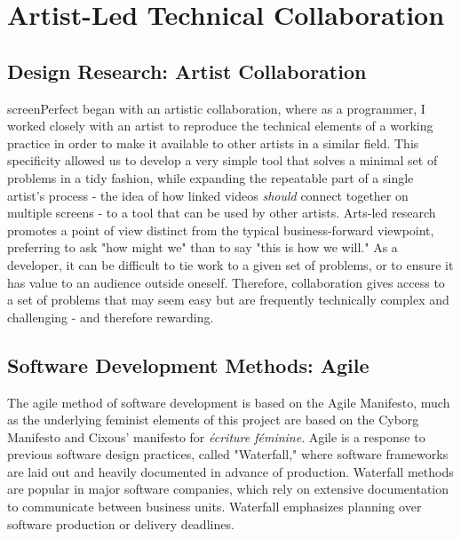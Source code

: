 \chapter{Artist-Led Technical Collaboration}\thispagestyle{empty} %

\label{Chapter2} %


\section{Design Research: Artist Collaboration}
screenPerfect began with an artistic collaboration, where as a programmer, I worked closely with an artist to reproduce the technical elements of a working practice in order to make it available to other artists in a similar field. This specificity allowed us to develop a very simple tool that solves a minimal set of problems in a tidy fashion, while expanding the repeatable part of a single artist's process - the idea of how linked videos \textit{should} connect together on multiple screens - to a tool that can be used by other artists. Arts-led research promotes a point of view distinct from the typical business-forward viewpoint, preferring to ask "how might we" than to say "this is how we will." As a developer, it can be difficult to tie work to a given set of problems, or to ensure it has value to an audience outside oneself. Therefore, collaboration gives access to a set of problems that may seem easy but are frequently technically complex and challenging - and therefore rewarding. 

\section{Software Development Methods: Agile}
The agile method of software development is based on the Agile Manifesto, much as the underlying feminist elements of this project are based on the Cyborg Manifesto and Cixous' manifesto for \textit{\'{e}criture f\'{e}minine}. Agile is a response to previous software design practices, called "Waterfall," where software frameworks are laid out and heavily documented in advance of production. Waterfall methods are popular in major software companies, which rely on extensive documentation to communicate between business units. Waterfall emphasizes planning over software production or delivery deadlines.

